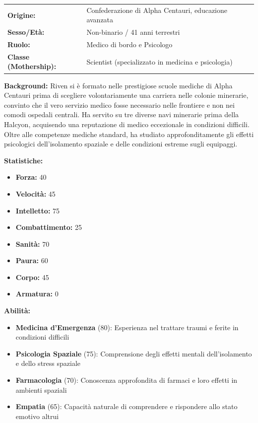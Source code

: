 \documentclass[11pt,a4paper]{article}
\begin{document}
\begin{tcolorbox}[colback=mininglightorange!20, colframe=miningorange]
\begin{tabularx}{\textwidth}{lX}
\textbf{Origine:} & Confederazione di Alpha Centauri, educazione avanzata \\
\textbf{Sesso/Età:} & Non-binario / 41 anni terrestri \\
\textbf{Ruolo:} & Medico di bordo e Psicologo \\
\textbf{Classe (Mothership):} & Scientist (specializzato in medicina e psicologia) \\
\end{tabularx}

\textbf{Background:} Riven si è formato nelle prestigiose scuole mediche di Alpha Centauri prima di scegliere volontariamente una carriera nelle colonie minerarie, convinto che il vero servizio medico fosse necessario nelle frontiere e non nei comodi ospedali centrali. Ha servito su tre diverse navi minerarie prima della Halcyon, acquisendo una reputazione di medico eccezionale in condizioni difficili. Oltre alle competenze mediche standard, ha studiato approfonditamente gli effetti psicologici dell'isolamento spaziale e delle condizioni estreme sugli equipaggi.

\textbf{Statistiche:}
\begin{itemize}[leftmargin=*]
\item \textbf{Forza:} 40
\item \textbf{Velocità:} 45
\item \textbf{Intelletto:} 75
\item \textbf{Combattimento:} 25
\item \textbf{Sanità:} 70
\item \textbf{Paura:} 60
\item \textbf{Corpo:} 45
\item \textbf{Armatura:} 0
\end{itemize}

\textbf{Abilità:}
\begin{itemize}[leftmargin=*]
\item \textbf{Medicina d'Emergenza} (80): Esperienza nel trattare traumi e ferite in condizioni difficili
\item \textbf{Psicologia Spaziale} (75): Comprensione degli effetti mentali dell'isolamento e dello stress spaziale
\item \textbf{Farmacologia} (70): Conoscenza approfondita di farmaci e loro effetti in ambienti spaziali
\item \textbf{Empatia} (65): Capacità naturale di comprendere e rispondere allo stato emotivo altrui
\end{itemize}


\end{tcolorbox}
\end{document}
